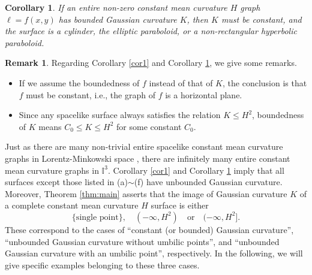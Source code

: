 \documentclass[12pt,a4paper,reqno]{amsart}
\theoremstyle{plain} %
\newtheorem{corollary}[theorem]{Corollary}
\theoremstyle{definition}
\newtheorem{remark}[theorem]{Remark}
\begin{document}
\begin{corollary}\label{cor2}
If an entire non-zero constant mean curvature $H$ graph $\ell=f(x,y)$ has bounded Gaussian curvature $K$, then $K$ must be constant, and the surface is a cylinder, the elliptic paraboloid, or a non-rectangular hyperbolic paraboloid.
\end{corollary}

\begin{remark}\label{rem:bound}
Regarding Corollary \ref{cor1} and Corollary \ref{cor2}, we give some remarks.
\begin{itemize}
\item If we assume the boundedness of $f$ instead of that of $K$, the conclusion is that $f$ must be constant,  i.e.,  the graph of $f$ is a horizontal plane.
\item Since any spacelike surface always satisfies the relation $K\leq H^2$, boundedness of $K$ means $C_0\leq K \leq H^2$ for some constant $C_0$.
\end{itemize}
\end{remark}

Just as there are many non-trivial entire spacelike constant mean curvature graphs in Lorentz-Minkowski space \cite{T}, there are infinitely many entire constant mean curvature graphs in $\mathbb{I}^3$. Corollary \ref{cor1} and Corollary \ref{cor2} imply that all surfaces except those listed in (a)$\sim$(f) have unbounded Gaussian curvature. Moreover, Theorem \ref{thm:main} asserts that the image of Gaussian curvature $K$ of a complete constant mean curvature $H$ surface is either 
	\[
		\{\text{single point}\},\quad (-\infty, H^2)\quad \text{or}\quad (-\infty, H^2].
	\]
These correspond to the cases of ``constant (or bounded) Gaussian curvature'', ``unbounded Gaussian curvature without umbilic points'', and ``unbounded Gaussian curvature with an umbilic point'', respectively. In the following, we will give specific examples belonging to these three cases.
\end{document}
